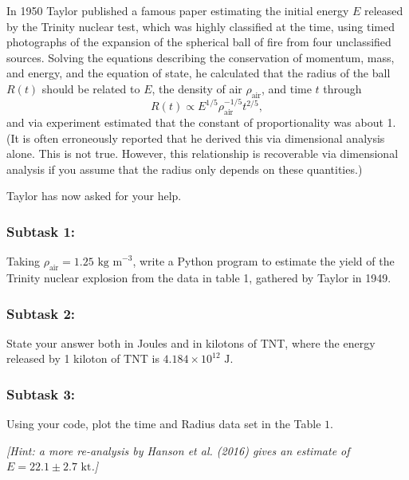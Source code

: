 \documentclass[12pt]{article}
\begin{document}
In 1950 Taylor published a famous paper estimating the initial energy $E$ released by the Trinity nuclear test, which was highly classified at the time, using timed photographs of the expansion of the spherical ball of fire from four unclassified sources. Solving the equations describing the conservation of momentum, mass, and energy, and the equation of state, he calculated that the radius of the ball $R(t)$ should be related to $E$, the density of air $\rho_{\text{air}}$, and time $t$ through
\[ R(t) \propto E^{1/5} \rho_{\text{air}}^{-1/5} t^{2/5}, \]
and via experiment estimated that the constant of proportionality was about 1. (It is often erroneously reported that he derived this via dimensional analysis alone. This is not true. However, this relationship is recoverable via dimensional analysis if you assume that the radius only depends on these quantities.)

\vspace{1em}


Taylor has now asked for your help.

\subsubsection*{\textbf{Subtask 1:}} 

Taking $\rho_{\text{air}} = 1.25 \text{ kg m}^{-3}$, write a Python program to estimate the yield of the Trinity nuclear explosion from the data in table 1, gathered by Taylor in 1949.

\subsubsection*{\textbf{Subtask 2:}} 
State your answer both in Joules and in kilotons of TNT, where the energy released by 1 kiloton of TNT is $4.184 \times 10^{12} \text{ J}$.

\subsubsection*{\textbf{Subtask 3:}} 
Using your code, plot the time and Radius data set in the Table $1$. 

\vspace{1em}

\noindent \textit{[Hint: a more re-analysis by Hanson et al. (2016) gives an estimate of $E = 22.1 \pm 2.7 \text{ kt}$.]}
\end{document}
